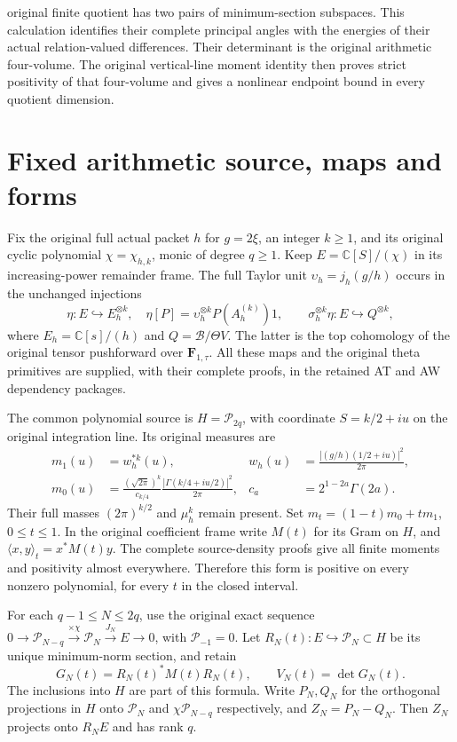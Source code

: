 \documentclass{article}
\newcommand{\C}{\mathbb C}
\newcommand{\cP}{\mathcal P}
\begin{document}
\maketitleThe original finite quotient has two pairs of minimum-section subspaces.
This calculation identifies their complete principal angles with the
energies of their actual relation-valued differences. Their determinant
is the original arithmetic four-volume. The original vertical-line
moment identity then proves strict positivity of that four-volume and
gives a nonlinear endpoint bound in every quotient dimension.

\section{Fixed arithmetic source, maps and forms}

Fix the original full actual packet $h$ for $g=2\xi$, an integer
$k\ge1$, and its original cyclic polynomial $\chi=\chi_{h,k}$,
monic of degree $q\ge1$. Keep $E=\C[S]/(\chi)$ in its
increasing-power remainder frame. The full Taylor unit
$\upsilon_h=j_h(g/h)$ occurs in the unchanged injections
\[
 \eta:E\hookrightarrow E_h^{\otimes k},\quad
 \eta[P]=\upsilon_h^{\otimes k}P(A_h^{(k)})1,
 \qquad \sigma_h^{\otimes k}\eta:E\hookrightarrow Q^{\otimes k},
 \tag{AGT1}
\]
where $E_h=\C[s]/(h)$ and $Q=\mathscr B/\Theta V$.
The latter is the top cohomology of the original tensor pushforward
over $\mathbf F_{1,\tau}$. All these maps and the original theta
primitives are supplied, with their complete proofs, in the retained
AT and AW dependency packages.

The common polynomial source is $H=\cP_{2q}$, with coordinate
$S=k/2+iu$ on the original integration line. Its original measures
are
\[
 \begin{aligned}
 m_1(u)&=w_h^{*k}(u),&
 w_h(u)&=\frac{|(g/h)(1/2+iu)|^2}{2\pi},\\
 m_0(u)&=\frac{(\sqrt{2\pi})^k}{c_{k/4}}
       \frac{|\Gamma(k/4+iu/2)|^2}{2\pi},&
 c_a&=2^{1-2a}\Gamma(2a).
 \end{aligned}
 \tag{AGT2}
\]
Their full masses $(2\pi)^{k/2}$ and $\mu_h^k$ remain present.
Set $m_t=(1-t)m_0+tm_1$, $0\le t\le1$. In the original coefficient
frame write $M(t)$ for its Gram on $H$, and
$\langle x,y\rangle_t=x^*M(t)y$.
The complete source-density proofs give all finite moments and
positivity almost everywhere. Therefore this form is positive on
every nonzero polynomial, for every $t$ in the closed interval.

For each $q-1\le N\le2q$, use the original exact sequence
$0\to\cP_{N-q}\xrightarrow{\times\chi}\cP_N
\xrightarrow{J_N}E\to0$, with $\cP_{-1}=0$.
Let $R_N(t):E\hookrightarrow\cP_N\subset H$ be its unique
minimum-norm section, and retain
\[
 G_N(t)=R_N(t)^*M(t)R_N(t),\qquad V_N(t)=\det G_N(t).
 \tag{AGT3}
\]
The inclusions into $H$ are part of this formula.
Write $P_N,Q_N$ for the orthogonal projections in $H$ onto
$\cP_N$ and $\chi\cP_{N-q}$ respectively, and
$Z_N=P_N-Q_N$. Then $Z_N$ projects onto $R_NE$ and has rank $q$.
\end{document}
